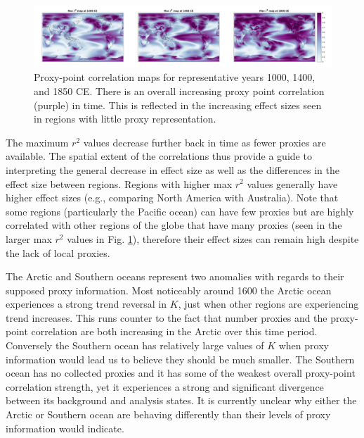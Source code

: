 \documentclass[12pt]{article}
\begin{document}
\begin{figure}
	\begin{center}
    \includegraphics[width=\textwidth,valign=c]{misc/corr_map.png}
    \caption{Proxy-point correlation maps for representative years 1000, 1400, and 1850 CE. There is an overall increasing proxy point correlation (purple) in time. This is reflected in the increasing effect sizes seen in regions with little proxy representation.}
    \label{corr}
    \end{center}
\end{figure}

The maximum $r^2$ values decrease further back in time as fewer proxies are available. The spatial extent of the correlations thus provide a guide to interpreting the  general decrease in effect size as well as the differences in the effect size between regions. Regions with higher max $r^2$ values generally have higher effect sizes (e.g., comparing North America with Australia). Note that some regions (particularly the Pacific ocean) can have few proxies but are highly correlated with other regions of the globe that have many proxies (seen in the larger max $r^2$ values in Fig. \ref{corr}), therefore their effect sizes can remain high despite the lack of local proxies. 

The Arctic and Southern oceans represent two anomalies with regards to their supposed proxy information. Most noticeably around 1600 the Arctic ocean experiences a strong trend reversal in $K$, just when other regions are experiencing trend increases. This runs counter to the fact that number proxies and the proxy-point correlation are both increasing in the Arctic over this time period. Conversely the Southern ocean has relatively large values of $K$ when proxy information would lead us to believe they should be much smaller. The Southern ocean has no collected proxies and it has some of the weakest overall proxy-point correlation strength, yet it experiences a strong and significant divergence between its background and analysis states. It is currently unclear why either the Arctic or Southern ocean are behaving differently than their levels of proxy information would indicate.

\end{document}
